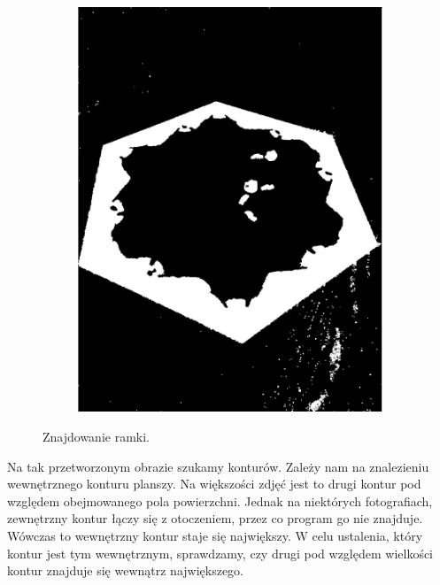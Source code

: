\documentclass[a4paper]{article}
\begin{document}
\begin{figure}[h]
\begin{subfigure}[]{.5\linewidth}
        \end{subfigure}
        \begin{subfigure}[]{0.5\linewidth}
        \includegraphics[width=\linewidth]{pictures/steps/find_water_dilate.png}
        \end{subfigure}

        \caption{Znajdowanie ramki.}
        \label{fig:step1}
    \end{figure}

    Na tak przetworzonym obrazie szukamy konturów. Zależy nam na znalezieniu wewnętrznego konturu planszy. Na większości zdjęć jest to drugi kontur pod względem obejmowanego pola powierzchni. Jednak na niektórych fotografiach, zewnętrzny kontur łączy się z otoczeniem, przez co program go nie znajduje. Wówczas to wewnętrzny kontur staje się największy. W celu ustalenia, który kontur jest tym wewnętrznym, sprawdzamy, czy drugi pod względem wielkości kontur znajduje się wewnątrz największego.
\end{document}

